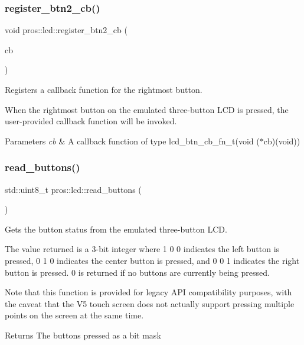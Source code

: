 \subsubsection{\texorpdfstring{register\+\_\+btn2\+\_\+cb()}{register\_btn2\_cb()}}
{\footnotesize\ttfamily void pros\+::lcd\+::register\+\_\+btn2\+\_\+cb (\begin{DoxyParamCaption}\item[{\hyperlink{namespacepros_1_1lcd_ab5c0cdcf37795ff2a9dcaf546b087dd4}{lcd\+\_\+btn\+\_\+cb\+\_\+fn\+\_\+t}}]{cb }\end{DoxyParamCaption})}



Registers a callback function for the rightmost button. 

When the rightmost button on the emulated three-\/button L\+CD is pressed, the user-\/provided callback function will be invoked.


\begin{DoxyParams}{Parameters}
{\em cb} & A callback function of type lcd\+\_\+btn\+\_\+cb\+\_\+fn\+\_\+t(void ($\ast$cb)(void)) \\
\hline
\end{DoxyParams}
\mbox{\label{namespacepros_1_1lcd_aa6ba655373f3eb0d9ef702337e89f624}} 
\subsubsection{\texorpdfstring{read\+\_\+buttons()}{read\_buttons()}}
{\footnotesize\ttfamily std\+::uint8\+\_\+t pros\+::lcd\+::read\+\_\+buttons (\begin{DoxyParamCaption}\item[{void}]{ }\end{DoxyParamCaption})}



Gets the button status from the emulated three-\/button L\+CD. 

The value returned is a 3-\/bit integer where 1 0 0 indicates the left button is pressed, 0 1 0 indicates the center button is pressed, and 0 0 1 indicates the right button is pressed. 0 is returned if no buttons are currently being pressed.

Note that this function is provided for legacy A\+PI compatibility purposes, with the caveat that the V5 touch screen does not actually support pressing multiple points on the screen at the same time.

\begin{DoxyReturn}{Returns}
The buttons pressed as a bit mask 
\end{DoxyReturn}
